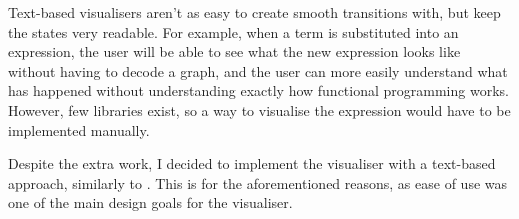Text-based visualisers aren't as easy to create smooth transitions with, but keep the states very readable. For example, when a term is substituted into an expression, the user will be able to see what the new expression looks like without having to decode a graph, and the user can more easily understand what has happened without understanding exactly how functional programming works. However, few libraries exist, so a way to visualise the expression would have to be implemented manually.

Despite the extra work, I decided to implement the visualiser with a text-based approach, similarly to \cite{visualize-cbn}. This is for the aforementioned reasons, as ease of use was one of the main design goals for the visualiser.